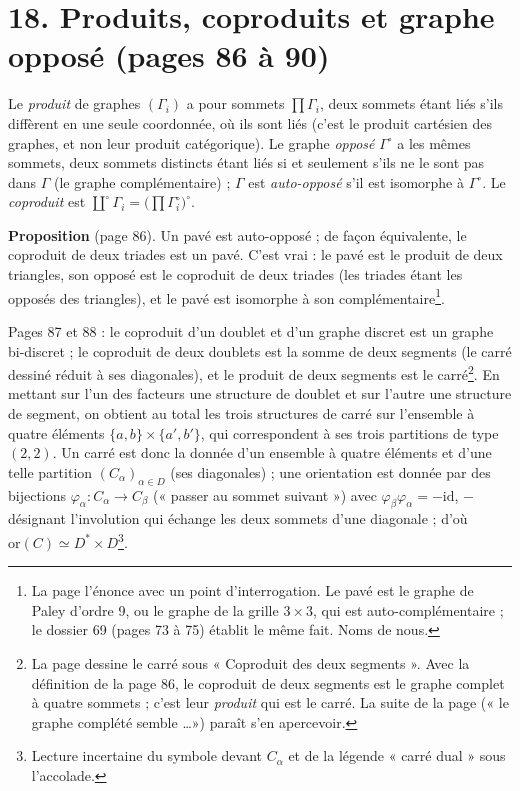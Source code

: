 \documentclass[11pt,a4paper]{article}
\begin{document}
\section*{18. Produits, coproduits et graphe opposé (pages 86 à 90)}

Le \emph{produit} de graphes $(\Gamma_i)$ a pour sommets $\prod \Gamma_i$, deux
sommets étant liés s'ils diffèrent en une seule coordonnée, où ils sont liés
(c'est le produit cartésien des graphes, et non leur produit catégorique). Le
graphe \emph{opposé} $\Gamma^\circ$ a les mêmes sommets, deux sommets distincts
étant liés si et seulement s'ils ne le sont pas dans $\Gamma$ (le graphe
complémentaire) ; $\Gamma$ est \emph{auto-opposé} s'il est isomorphe à
$\Gamma^\circ$. Le \emph{coproduit} est $\overset{\circ}{\coprod} \Gamma_i =
\bigl(\prod \Gamma_i^\circ\bigr)^\circ$.

\textbf{Proposition} (page 86). Un pavé est auto-opposé ; de façon équivalente,
le coproduit de deux triades est un pavé. C'est vrai : le pavé est le produit
de deux triangles, son opposé est le coproduit de deux triades (les triades
étant les opposés des triangles), et le pavé est isomorphe à son
complémentaire\footnote{La page l'énonce avec un point d'interrogation. Le
pavé est le graphe de Paley d'ordre 9, ou le graphe de la grille $3 \times 3$,
qui est auto-complémentaire ; le dossier 69 (pages 73 à 75) établit le même
fait. Noms de nous.}.

Pages 87 et 88 : le coproduit d'un doublet et d'un graphe discret est un graphe
bi-discret ; le coproduit de deux doublets est la somme de deux segments (le
carré dessiné réduit à ses diagonales), et le produit de deux segments est le
carré\footnote{La page dessine le carré sous « Coproduit des deux segments ».
Avec la définition de la page 86, le coproduit de deux segments est le graphe
complet à quatre sommets ; c'est leur \emph{produit} qui est le carré. La
suite de la page (« le graphe complété semble \ldots ») paraît s'en apercevoir.}.
En mettant sur l'un des facteurs une structure de doublet et sur l'autre une
structure de segment, on obtient au total les trois structures de carré sur
l'ensemble à quatre éléments $\lbrace a, b\rbrace \times \lbrace a', b'\rbrace$,
qui correspondent à ses trois partitions de type $(2, 2)$. Un carré est donc la
donnée d'un ensemble à quatre éléments et d'une telle partition $(C_\alpha)_{\alpha
\in D}$ (ses diagonales) ; une orientation est donnée par des bijections
$\varphi_\alpha : C_\alpha \to C_\beta$ (« passer au sommet suivant ») avec
$\varphi_\beta \varphi_\alpha = -\mathrm{id}$, $-$ désignant l'involution qui
échange les deux sommets d'une diagonale ; d'où $\mathrm{or}(C) \simeq D^* \times
D$\footnote{Lecture incertaine du symbole devant $C_\alpha$ et de la légende
« carré dual » sous l'accolade.}.
\end{document}
